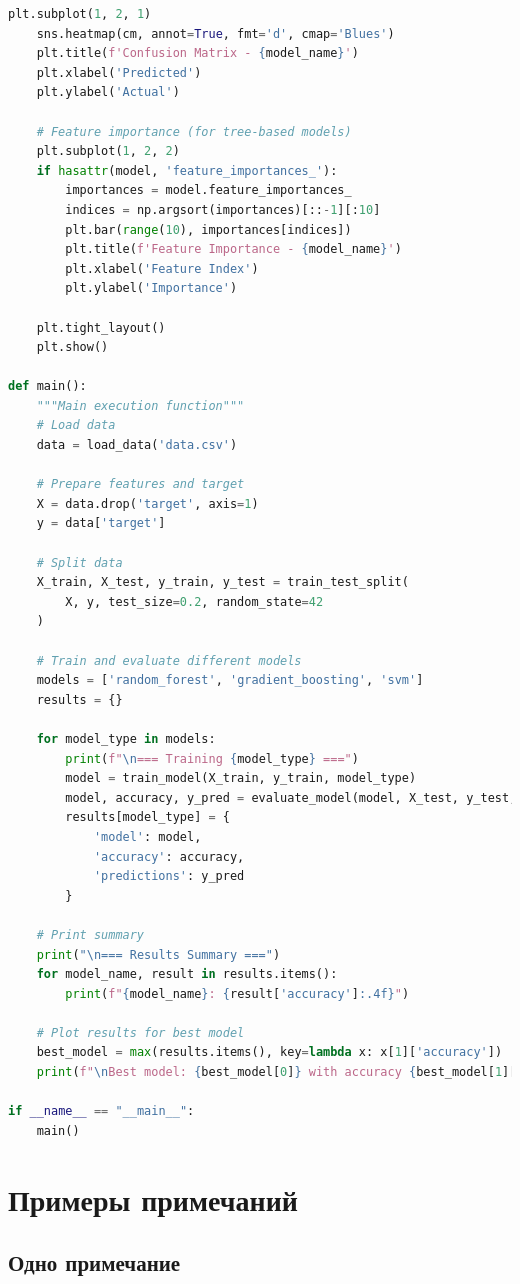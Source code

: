 \begin{lstlisting}[language=Python, caption={Пример алгоритма машинного обучения}, label={lst:ml_algorithm}, style=breakable]
    plt.subplot(1, 2, 1)
    sns.heatmap(cm, annot=True, fmt='d', cmap='Blues')
    plt.title(f'Confusion Matrix - {model_name}')
    plt.xlabel('Predicted')
    plt.ylabel('Actual')
    
    # Feature importance (for tree-based models)
    plt.subplot(1, 2, 2)
    if hasattr(model, 'feature_importances_'):
        importances = model.feature_importances_
        indices = np.argsort(importances)[::-1][:10]
        plt.bar(range(10), importances[indices])
        plt.title(f'Feature Importance - {model_name}')
        plt.xlabel('Feature Index')
        plt.ylabel('Importance')
    
    plt.tight_layout()
    plt.show()

def main():
    """Main execution function"""
    # Load data
    data = load_data('data.csv')
    
    # Prepare features and target
    X = data.drop('target', axis=1)
    y = data['target']
    
    # Split data
    X_train, X_test, y_train, y_test = train_test_split(
        X, y, test_size=0.2, random_state=42
    )
    
    # Train and evaluate different models
    models = ['random_forest', 'gradient_boosting', 'svm']
    results = {}
    
    for model_type in models:
        print(f"\n=== Training {model_type} ===")
        model = train_model(X_train, y_train, model_type)
        model, accuracy, y_pred = evaluate_model(model, X_test, y_test, model_type)
        results[model_type] = {
            'model': model,
            'accuracy': accuracy,
            'predictions': y_pred
        }
    
    # Print summary
    print("\n=== Results Summary ===")
    for model_name, result in results.items():
        print(f"{model_name}: {result['accuracy']:.4f}")
    
    # Plot results for best model
    best_model = max(results.items(), key=lambda x: x[1]['accuracy'])
    print(f"\nBest model: {best_model[0]} with accuracy {best_model[1]['accuracy']:.4f}")

if __name__ == "__main__":
    main()
\end{lstlisting}

\section{Примеры примечаний}

\subsection{Одно примечание}


